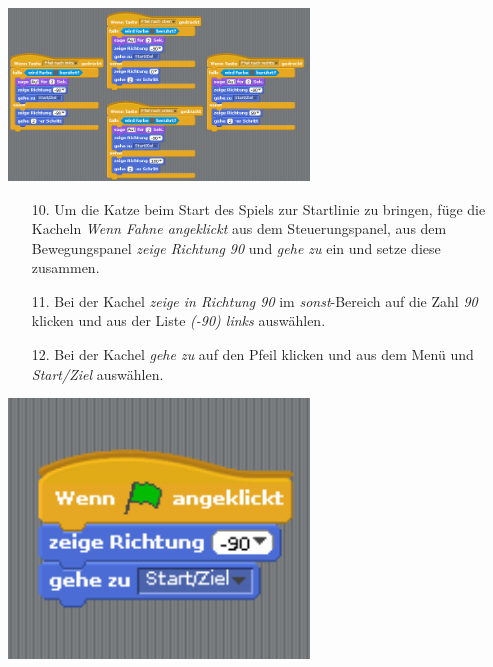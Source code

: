 \includegraphics[width=0.6\textwidth]{images/aufgabe4_katze_alle_richtungen.png}
\begin{itemize}
\item[10. ] Um die Katze beim Start des Spiels zur Startlinie zu bringen, f{\"u}ge die Kacheln \textit{Wenn Fahne angeklickt} aus dem Steuerungspanel, aus dem Bewegungspanel \textit{zeige Richtung 90} und \textit{gehe zu} ein und setze diese zusammen.
\item[11. ] Bei der Kachel \textit{zeige in Richtung 90} im \textit{sonst}-Bereich auf die Zahl \textit{90} klicken und aus der Liste \textit{(-90) links} ausw{\"a}hlen.
\item[12. ] Bei der Kachel \textit{gehe zu} auf den Pfeil klicken und aus dem Men{\"u} und \textit{Start/Ziel} ausw{\"a}hlen.
\end{itemize}
\includegraphics[width=0.6\textwidth]{images/aufgabe4_katze_an_start_stop.png}

